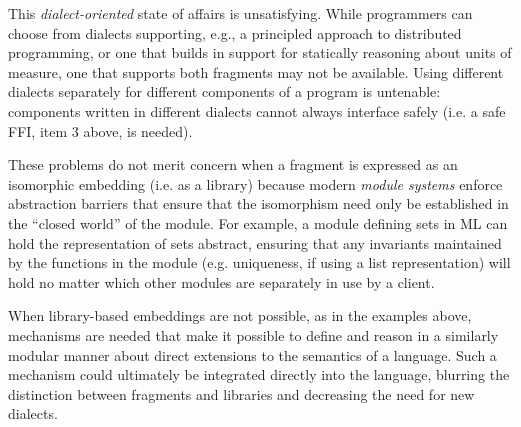 \documentclass[10pt,preprint]{sigplanconf}
\begin{document}
This \emph{dialect-oriented} state of affairs is unsatisfying. %
While programmers can choose from dialects supporting, e.g., a principled approach to distributed programming, or one that builds in support for statically reasoning about units of measure, one that supports both fragments may not be available. Using different dialects separately for different components of a program is untenable: components written in different dialects cannot always interface safely (i.e. a safe FFI, item 3 above, is needed). 

These problems do not merit concern when a fragment is expressed as an isomorphic embedding (i.e. as a library) because modern \emph{module systems} enforce abstraction barriers that ensure that the isomorphism need only be established in the ``closed world'' of the module. For example, a module defining sets in ML can hold the representation of sets abstract, ensuring that any invariants maintained by the functions in the module (e.g. uniqueness, if using a list representation) will hold no matter which other modules are separately in use by a client. %

When library-based embeddings are not possible, as in the examples above, mechanisms are needed that make it possible to define and  reason in a similarly modular manner about  direct extensions to the semantics of a language. Such a mechanism could ultimately be integrated directly into the language, blurring the distinction between fragments and libraries and decreasing the need for new dialects.%
\end{document}
